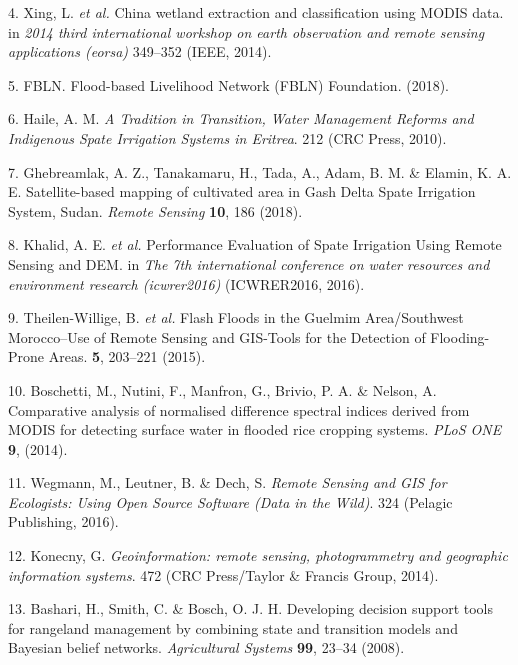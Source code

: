 \documentclass[12pt,oneside]{article}
\begin{document}
\leavevmode\hypertarget{ref-Xing_et_al_2014}{}%
4. Xing, L. \emph{et al.} China wetland extraction and classification using MODIS data. in \emph{2014 third international workshop on earth observation and remote sensing applications (eorsa)} 349--352 (IEEE, 2014).

\leavevmode\hypertarget{ref-FBLN_2018}{}%
5. FBLN. Flood-based Livelihood Network (FBLN) Foundation. (2018).

\leavevmode\hypertarget{ref-Haile_2010}{}%
6. Haile, A. M. \emph{A Tradition in Transition, Water Management Reforms and Indigenous Spate Irrigation Systems in Eritrea}. 212 (CRC Press, 2010).

\leavevmode\hypertarget{ref-Ghebreamlak_et_al_2018}{}%
7. Ghebreamlak, A. Z., Tanakamaru, H., Tada, A., Adam, B. M. \& Elamin, K. A. E. Satellite-based mapping of cultivated area in Gash Delta Spate Irrigation System, Sudan. \emph{Remote Sensing} \textbf{10}, 186 (2018).

\leavevmode\hypertarget{ref-Khalid_et_al_2016}{}%
8. Khalid, A. E. \emph{et al.} Performance Evaluation of Spate Irrigation Using Remote Sensing and DEM. in \emph{The 7th international conference on water resources and environment research (icwrer2016)} (ICWRER2016, 2016).

\leavevmode\hypertarget{ref-Theilen-Willige_et_al_2015}{}%
9. Theilen-Willige, B. \emph{et al.} Flash Floods in the Guelmim Area/Southwest Morocco--Use of Remote Sensing and GIS-Tools for the Detection of Flooding-Prone Areas. \textbf{5}, 203--221 (2015).

\leavevmode\hypertarget{ref-Boschetti_et_al_2014}{}%
10. Boschetti, M., Nutini, F., Manfron, G., Brivio, P. A. \& Nelson, A. Comparative analysis of normalised difference spectral indices derived from MODIS for detecting surface water in flooded rice cropping systems. \emph{PLoS ONE} \textbf{9}, (2014).

\leavevmode\hypertarget{ref-Wegmann_et_al_2016}{}%
11. Wegmann, M., Leutner, B. \& Dech, S. \emph{Remote Sensing and GIS for Ecologists: Using Open Source Software (Data in the Wild)}. 324 (Pelagic Publishing, 2016).

\leavevmode\hypertarget{ref-Konecny_2014}{}%
12. Konecny, G. \emph{Geoinformation: remote sensing, photogrammetry and geographic information systems}. 472 (CRC Press/Taylor \& Francis Group, 2014).

\leavevmode\hypertarget{ref-Bashari_et_al_2008}{}%
13. Bashari, H., Smith, C. \& Bosch, O. J. H. Developing decision support tools for rangeland management by combining state and transition models and Bayesian belief networks. \emph{Agricultural Systems} \textbf{99}, 23--34 (2008).
\end{document}
